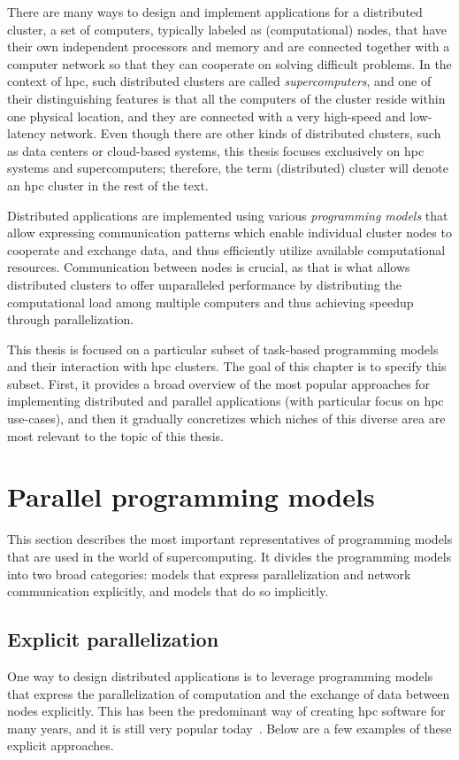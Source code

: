 There are many ways to design and implement applications for a distributed cluster, a set of
computers, typically labeled as (computational) nodes, that have their own independent processors
and memory and are connected together with a computer network so that they can cooperate on solving
difficult problems. In the context of \gls{hpc}, such distributed clusters are called
\emph{supercomputers}, and one of their distinguishing features is that all the computers of the
cluster reside within one physical location, and they are connected with a very high-speed and
low-latency network. Even though there are other kinds of distributed clusters, such as data
centers or cloud-based systems, this thesis focuses exclusively on \gls{hpc} systems
and supercomputers; therefore, the term (distributed) cluster will denote an \gls{hpc}
cluster in the rest of the text.

Distributed applications are implemented using various \emph{programming models} that allow expressing
communication patterns which enable individual cluster nodes to cooperate and exchange data, and
thus efficiently utilize available computational resources. Communication between nodes is crucial,
as that is what allows distributed clusters to offer unparalleled performance by distributing the
computational load among multiple computers and thus achieving speedup through parallelization.

This thesis is focused on a particular subset of task-based programming models and their
interaction with \gls{hpc} clusters. The goal of this chapter is to specify this
subset. First, it provides a broad overview of the most popular approaches for implementing
distributed and parallel applications (with particular focus on \gls{hpc} use-cases),
and then it gradually concretizes which niches of this diverse area are most relevant to the topic
of this thesis.

\section{Parallel programming models}
This section describes the most important representatives of programming models that are used in
the world of supercomputing. It divides the programming models into two broad categories: models
that express parallelization and network communication explicitly, and models that do so
implicitly.

\subsection*{Explicit parallelization}
One way to design distributed applications is to leverage programming models that express the
parallelization of computation and the exchange of data between nodes explicitly. This has been the
predominant way of creating \gls{hpc} software for many years, and it is still very
popular today~\cite{mpiusagestudy1,mpiusagestudy2,mpiusagestudy3}. Below are a few examples of these explicit approaches.

